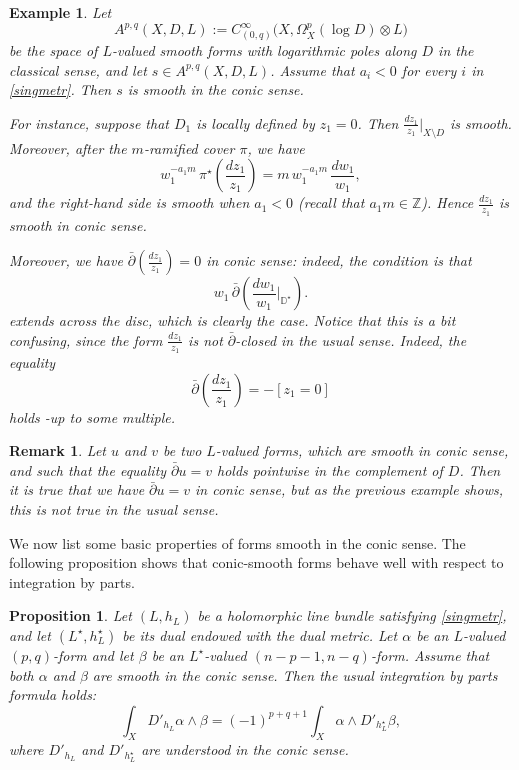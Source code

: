 \documentclass[english]{amsart}
\newcommand{\DD}{\mathbb D}
\newcommand{\dbar}{\bar \partial}
\newtheorem{proposition}[thm]{Proposition}
\newtheorem{exemple}[thm]{Example}
\newtheorem{remark}[thm]{Remark}
\numberwithin{equation}{thm}
\begin{document}
\begin{exemple}

	
	Let
	\[
	A^{p,q}(X,D,L):= C^\infty_{(0,q)}\bigl(X,\Omega_X^p(\log D)\otimes L\bigr)
	\]
	be the space of $L$-valued smooth forms with logarithmic poles along $D$ in the classical sense, and let $s\in A^{p,q}(X,D,L)$.
	Assume that $a_i<0$ for every $i$ in \eqref{singmetr}. Then $s$ is smooth in the conic sense.
	
	For instance, suppose that $D_1$ is locally defined by $z_1=0$. Then $\displaystyle \frac{dz_1}{z_1}\big|_{X\setminus D}$ is smooth. Moreover, after the $m$-ramified cover $\pi$, we have
	\[
	w_1^{-a_1 m}\,\pi^\star\!\left(\frac{dz_1}{z_1}\right)
	= m\, w_1^{-a_1 m}\,\frac{dw_1}{w_1},
	\]
	and the right-hand side is smooth when $a_1<0$ (recall that $a_1 m\in \mathbb Z$). Hence $\displaystyle \frac{dz_1}{z_1}$ is smooth in conic sense.
	
	Moreover, we have $\displaystyle \dbar(\frac{dz_1}{z_1})=0$ in conic sense: indeed, the condition is that
	\[
	w_1\,\dbar\!\left(\frac{dw_1}{w_1}\Big|_{\DD^\star}\right) .
	\]
	extends across the disc, which is clearly the case. 
	 Notice that this is a bit confusing, since the form $\displaystyle \frac{dz_1}{z_1}$ is not $\dbar$-closed in the usual sense. Indeed, the equality
$$\dbar\!\left(\frac{dz_1}{z_1}\right) = -[z_1=0]$$
holds -up to some multiple.
\end{exemple}

\medskip

\begin{remark}
Let $u$ and $v$ be two $L$-valued forms, which are smooth in conic sense, and such that the equality $\dbar u= v$ holds pointwise in the complement of $D$. Then it is true that we have $\dbar u= v$ in conic sense, but as the previous example shows, this is not true in the usual sense.
\end{remark}

\medskip

We now list some basic properties of forms smooth in the conic sense. The following proposition shows that conic-smooth forms behave well with respect to integration by parts.

\begin{proposition}\cite[Cor 2.19]{JCMP}\label{int}
	Let $(L,h_L)$ be a holomorphic line bundle satisfying \eqref{singmetr}, and let $(L^\star,h_L^\star)$ be its dual endowed with the dual metric.
	Let $\alpha$ be an $L$-valued $(p,q)$-form and let $\beta$ be an $L^\star$-valued $(n-p-1,n-q)$-form. Assume that both $\alpha$ and $\beta$ are smooth in the conic sense.
	Then the usual integration by parts formula holds:
	\begin{equation}\label{van40}
		\int_X D'_{h_L}\alpha\wedge \beta
		= (-1)^{p+q+1}\int_X \alpha\wedge D'_{h_L^\star}\beta,
	\end{equation}
	where $D'_{h_L}$ and $D'_{h_L^\star}$ are understood in the conic sense.
\end{proposition}
\end{document}
